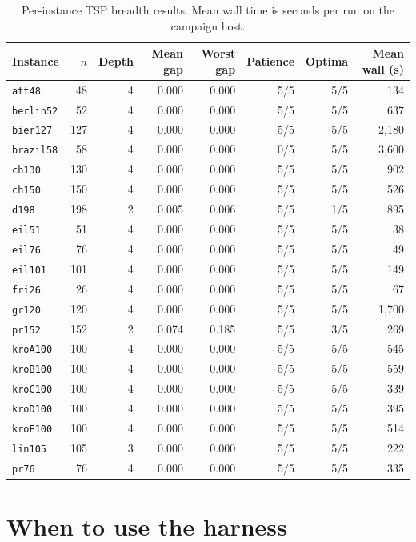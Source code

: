 \documentclass[10pt]{article}
\begin{document}
\begin{table}[H]
\centering
\caption{Per-instance TSP breadth results. Mean wall time is seconds per run on the campaign host.}
\small
\begin{tabular}{lrrrrrrr}
\toprule
Instance & $n$ & Depth & Mean gap & Worst gap & Patience & Optima & Mean wall (s) \\
\midrule
\texttt{att48} & 48 & 4 & 0.000 & 0.000 & 5/5 & 5/5 & 134 \\
\texttt{berlin52} & 52 & 4 & 0.000 & 0.000 & 5/5 & 5/5 & 637 \\
\texttt{bier127} & 127 & 4 & 0.000 & 0.000 & 5/5 & 5/5 & 2,180 \\
\texttt{brazil58} & 58 & 4 & 0.000 & 0.000 & 0/5 & 5/5 & 3,600 \\
\texttt{ch130} & 130 & 4 & 0.000 & 0.000 & 5/5 & 5/5 & 902 \\
\texttt{ch150} & 150 & 4 & 0.000 & 0.000 & 5/5 & 5/5 & 526 \\
\texttt{d198} & 198 & 2 & 0.005 & 0.006 & 5/5 & 1/5 & 895 \\
\texttt{eil51} & 51 & 4 & 0.000 & 0.000 & 5/5 & 5/5 & 38 \\
\texttt{eil76} & 76 & 4 & 0.000 & 0.000 & 5/5 & 5/5 & 49 \\
\texttt{eil101} & 101 & 4 & 0.000 & 0.000 & 5/5 & 5/5 & 149 \\
\texttt{fri26} & 26 & 4 & 0.000 & 0.000 & 5/5 & 5/5 & 67 \\
\texttt{gr120} & 120 & 4 & 0.000 & 0.000 & 5/5 & 5/5 & 1,700 \\
\texttt{pr152} & 152 & 2 & 0.074 & 0.185 & 5/5 & 3/5 & 269 \\
\texttt{kroA100} & 100 & 4 & 0.000 & 0.000 & 5/5 & 5/5 & 545 \\
\texttt{kroB100} & 100 & 4 & 0.000 & 0.000 & 5/5 & 5/5 & 559 \\
\texttt{kroC100} & 100 & 4 & 0.000 & 0.000 & 5/5 & 5/5 & 339 \\
\texttt{kroD100} & 100 & 4 & 0.000 & 0.000 & 5/5 & 5/5 & 395 \\
\texttt{kroE100} & 100 & 4 & 0.000 & 0.000 & 5/5 & 5/5 & 514 \\
\texttt{lin105} & 105 & 3 & 0.000 & 0.000 & 5/5 & 5/5 & 222 \\
\texttt{pr76} & 76 & 4 & 0.000 & 0.000 & 5/5 & 5/5 & 335 \\
\bottomrule
\end{tabular}
\end{table}

\section{When to use the harness}
\end{document}
